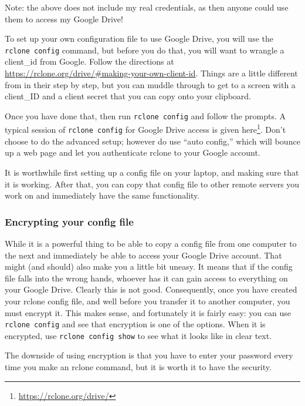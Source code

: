 \documentclass[]{krantz}
\renewcommand{\href}[2]{#2\footnote{\url{#1}}}
\begin{document}
Note: the above does not include my
real credentials, as then anyone could use them to access my Google Drive!

To set up your own configuration file to use Google Drive, you will use the \texttt{rclone\ config}
command, but before you do that, you will want to wrangle a client\_id from Google. Follow
the directions at \url{https://rclone.org/drive/\#making-your-own-client-id}. Things are a little different from in their step
by step, but you can muddle through to get to a screen with a client\_ID and a client
secret that you can copy onto your clipboard.

Once you have done that, then run \texttt{rclone\ config} and follow the prompts. A
typical session of \texttt{rclone\ config} for Google Drive access is given
\href{https://rclone.org/drive/}{here}. Don't choose to do the advanced setup; however
do use ``auto config,'' which will bounce up a web page and let you authenticate rclone
to your Google account.

It is worthwhile first setting up a config file on your laptop, and making sure
that it is working. After that, you can copy that config file to other remote
servers you work on and immediately have the same functionality.

\hypertarget{encrypting-your-config-file}{%
\subsubsection{Encrypting your config file}\label{encrypting-your-config-file}}

While it is a powerful thing to be able to copy a config file from
one computer to the next and immediately be able to access your Google
Drive account. That might (and should) also make you a little bit
uneasy. It means that if the config file falls into the wrong hands,
whoever has it can gain access to everything on your Google Drive. Clearly
this is not good. Consequently, once you have created your rclone config
file, and well before you transfer it to another computer, you must
encrypt it. This makes sense, and fortunately it is fairly easy: you can
use \texttt{rclone\ config} and see that encryption is one of
the options. When it is encrypted, use \texttt{rclone\ config\ show} to see what
it looks like in clear text.

The downside of using encryption is that you have to enter your password
every time you make an rclone command, but it is worth it to have the
security.
\end{document}
